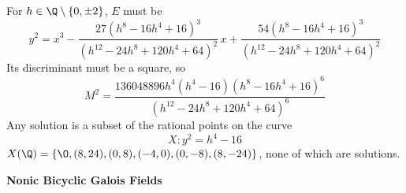 \begin{frame}[plain]
For $h \in \Q \setminus \{0,\pm2\}$, $E$ must be
	\[
	y^2= x^3 - \dfrac{27(h^8-16h^4+16)^3}{(h^{12}-24h^8+120h^4+64)^2} \,x + \dfrac{54(h^8-16h^4+16)^3}{(h^{12}-24h^8+120h^4+64)^2}
	\] \pause
Its discriminant must be a square, so
	\[
	M^2= \dfrac{136048896h^4(h^4-16)(h^8-16h^4+16)^6}{(h^{12}-24h^8+120h^4+64)^6}
	\] \pause
Any solution is a subset of the rational points on the curve
	\[
	X: y^2= h^4 - 16
	\] \pause
$X(\Q)= \{\O,(8,24),(0,8),(-4,0),(0,-8),(8,-24)\}$, none of which are solutions.
\end{frame}



\begin{frame}[plain]
\vfill
\begin{center} {\bfseries \Large \textcolor{UniGray}{Nonic Bicyclic Galois Fields}} \end{center}
\vfill 
\end{frame}



